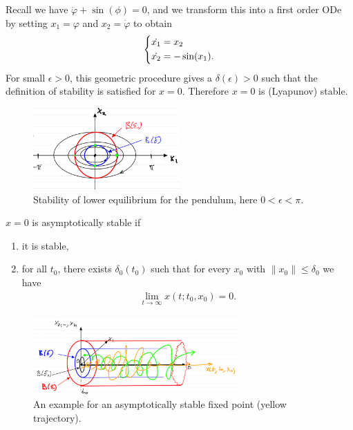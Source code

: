 \begin{ex}
	Recall we have $\ddot{\varphi} + \sin(\phi) = 0$, and we transform this into a first order ODe by setting $x_1 = \varphi$ and $x_2 = \dot{\varphi}$ to obtain
	\begin{align}
		\begin{dcases}
			\dot{x_1} = x_2 \\
			\dot{x_2} = -\sin(x_1).
		\end{dcases}
	\end{align}
	For small $\epsilon>0$, this geometric procedure gives a $\delta(\epsilon)>0$ such that the definition of stability is satisfied for $x=0$. Therefore $x=0$ is (Lyapunov) stable.
	\begin{figure}[h!]
		\centering
		\includegraphics[width=0.5\textwidth]{figures/ch2/2pendulum_stability.png}
		\caption{Stability of lower equilibrium for the pendulum, here $0<\epsilon<\pi $.}
	\end{figure}
\end{ex}

\begin{definition}
$x=0$ is asymptotically stable if
\begin{enumerate}
	\item it is stable,
	\item for all $t_0$, there exists $\delta_0(t_0)$ such that for every $x_0$ with $\| x_0 \| \leq \delta_0$ we have
		\begin{align}
			\boxed{\lim_{t\to \infty } x(t; t_0, x_0) = 0.}
		\end{align}
\end{enumerate}
\begin{figure}[h]
	\centering
	\includegraphics[width=0.7\textwidth]{figures/ch2/3asymp_stability.png}
	\caption{An example for an asymptotically stable fixed point (yellow trajectory).}
\end{figure}
\end{definition}

